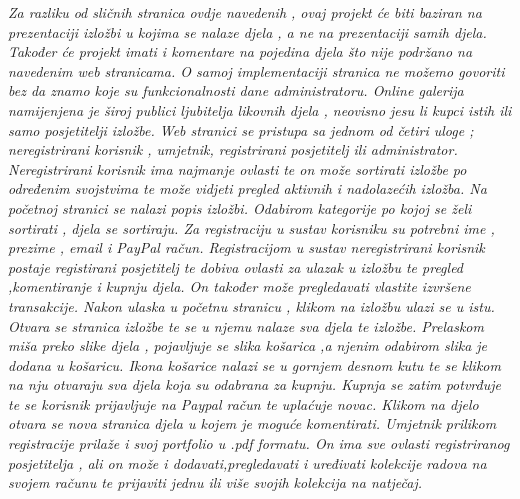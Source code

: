 		\vspace{10mm} 
			
		
		\textit{Za razliku od sličnih stranica ovdje navedenih , ovaj projekt će biti baziran na prezentaciji izložbi u kojima se nalaze djela , a ne na prezentaciji samih djela. 
			Također će projekt 	imati i komentare na pojedina djela što nije podržano na navedenim web stranicama. O samoj implementaciji stranica ne možemo govoriti bez da znamo koje su funkcionalnosti  dane administratoru.
			\newline Online galerija namijenjena je široj publici ljubitelja likovnih djela , neovisno jesu li kupci istih ili samo posjetitelji izložbe.
			\vspace{3mm}
			\newline Web stranici se pristupa sa jednom od četiri uloge ; neregistrirani korisnik , umjetnik, registrirani posjetitelj ili administrator. Neregistrirani korisnik ima najmanje ovlasti te on može  sortirati izložbe po određenim svojstvima te može vidjeti pregled aktivnih i nadolazećih izložba. 
			\newline Na početnoj stranici se nalazi popis izložbi. Odabirom kategorije po kojoj se želi sortirati , djela se sortiraju.
			\newline Za registraciju u sustav korisniku su potrebni ime , prezime , email i PayPal račun.
			\vspace{3mm}
			\newline Registracijom u sustav neregistrirani korisnik postaje registirani posjetitelj te dobiva ovlasti za ulazak u izložbu te pregled ,komentiranje i kupnju djela. On također može  pregledavati vlastite izvršene transakcije.
			\newline Nakon ulaska u početnu stranicu , klikom na izložbu ulazi se u istu. Otvara se stranica izložbe te se u njemu nalaze sva djela te izložbe.
			\newline Prelaskom miša preko slike djela , pojavljuje se slika košarica ,a njenim odabirom slika je dodana u košaricu. Ikona košarice nalazi se u gornjem desnom kutu te se klikom na nju  otvaraju sva djela koja su odabrana za kupnju. Kupnja se zatim potvrđuje te se korisnik prijavljuje na Paypal račun te uplaćuje novac. 
			\newline Klikom na djelo otvara se nova stranica djela u kojem je moguće komentirati. 
			\vspace{3mm}
			\newline Umjetnik prilikom registracije prilaže i svoj portfolio u .pdf formatu. On ima sve ovlasti registriranog posjetitelja , ali on može i dodavati,pregledavati i uređivati kolekcije radova na  svojem računu te prijaviti jednu ili više svojih kolekcija na natječaj.
}

